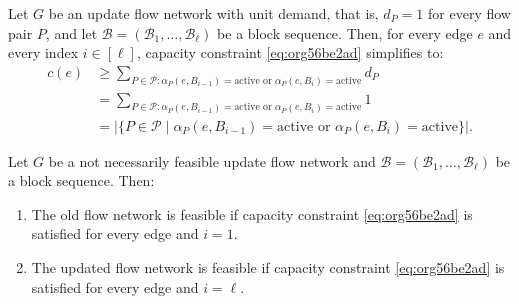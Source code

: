 \documentclass[fontsize=11pt,paper=a4]{book}
\begin{document}
\begin{remark}
Let \(G\) be an update flow network with unit demand, that is, \(d_P=1\) for every flow pair \(P\), and let \(\mathcal{B}=(\mathscr{B}_1,\dots,\mathscr{B}_{\ell})\) be a block sequence.
Then, for every edge \(e\) and every index \(i\in[\ell]\), capacity constraint \ref{eq:org56be2ad} simplifies to:
\begin{align*}
c(e)
&\geq\sum_{P\in\mathcal{P}:\alpha_P(e,B_{i-1})=\mathrm{active}\text{ or }\alpha_P(e,B_i)=\mathrm{active}}d_P\\
&=\sum_{P\in\mathcal{P}:\alpha_P(e,B_{i-1})=\mathrm{active}\text{ or }\alpha_P(e,B_i)=\mathrm{active}}1\\
&=\lvert\{P\in\mathcal{P}\mid\alpha_P(e,B_{i-1})=\mathrm{active}\text{ or }\alpha_P(e,B_i)=\mathrm{active}\}\rvert.
\end{align*}
\label{org14d79a1}
\end{remark}

\begin{lem}
Let \(G\) be a not necessarily feasible update flow network and \(\mathcal{B}=(\mathscr{B}_1,\dots,\mathscr{B}_{\ell})\) be a block sequence. Then:

\begin{enumerate}
\item \label{itm:lem-update-flow-network-feasible-if-1}
The old flow network is feasible if capacity constraint \ref{eq:org56be2ad} is satisfied for every edge and \(i=1\).

\item \label{itm:lem-update-flow-network-feasible-if-2}
The updated flow network is feasible if capacity constraint \ref{eq:org56be2ad} is satisfied for every edge and \(i=\ell\).
\end{enumerate}
\label{org28f0752}
\end{lem}
\end{document}
